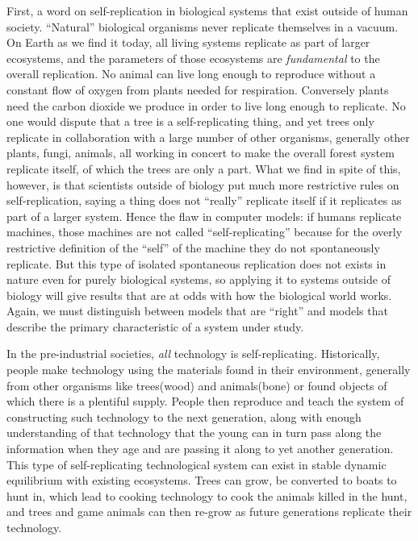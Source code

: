First, a word on self-replication in biological systems that exist
outside of human society. ``Natural'' biological organisms never
replicate themselves in a vacuum. On Earth as we find it today, all
living systems replicate as part of larger ecosystems, and the
parameters of those ecosystems are \emph{fundamental} to the overall
replication. No animal can live long enough to reproduce without a
constant flow of oxygen from plants needed for respiration. Conversely
plants need the carbon dioxide we produce in order to live long enough
to replicate. No one would dispute that a tree is a self-replicating
thing, and yet trees only replicate in collaboration with a large number
of other organisms, generally other plants, fungi, animals, all working
in concert to make the overall forest system replicate itself, of which
the trees are only a part. What we find in spite of this, however, is
that scientists outside of biology put much more restrictive rules on
self-replication, saying a thing does not ``really'' replicate itself if
it replicates as part of a larger system. Hence the flaw in computer
models: if humans replicate machines, those machines are not called
``self-replicating'' because for the overly restrictive definition of
the ``self'' of the machine they do not spontaneously replicate. But
this type of isolated spontaneous replication does not exists in nature
even for purely biological systems, so applying it to systems outside of
biology will give results that are at odds with how the biological world
works. Again, we must distinguish between models that are ``right'' and
models that describe the primary characteristic of a system under study.

In the pre-industrial societies, \emph{all} technology is
self-replicating. Historically, people make technology using the
materials found in their environment, generally from other organisms
like trees(wood) and animals(bone) or found objects of which there is a
plentiful supply. People then reproduce and teach the system of
constructing such technology to the next generation, along with enough
understanding of that technology that the young can in turn pass along
the information when they age and are passing it along to yet another
generation. This type of self-replicating technological system can exist
in stable dynamic equilibrium with existing ecosystems. Trees can grow,
be converted to boats to hunt in, which lead to cooking technology to
cook the animals killed in the hunt, and trees and game animals can then
re-grow as future generations replicate their technology.

